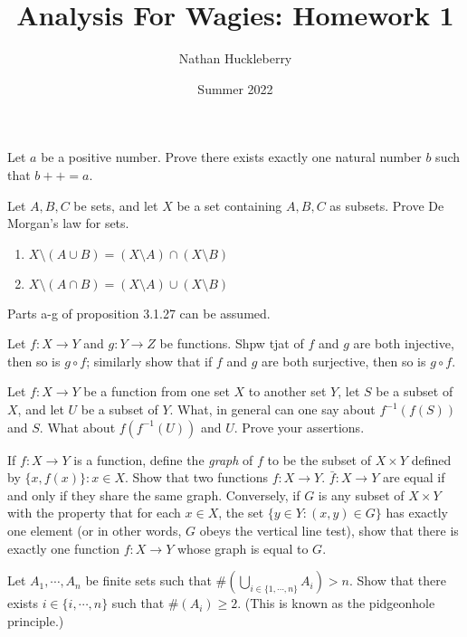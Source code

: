 \documentclass{article}
\title{Analysis For Wagies: Homework 1}
\author{Nathan Huckleberry} %
\date{Summer 2022}
\newenvironment{problem}[2][Problem]{\begin{trivlist}
     \item[\hskip \labelsep {\bfseries #1}\hskip \labelsep {\bfseries #2.}]}
{\end{trivlist}}
\begin{document}
\maketitle

\begin{problem}{2.2.2}
Let $a$ be a positive number. Prove there exists exactly one natural number $b$ such that $b++ = a$.
\end{problem}

\begin{problem}{3.1.6}
Let $A, B, C$ be sets, and let $X$ be a set containing $A, B, C$ as subsets. Prove De Morgan's law for sets.
\begin{enumerate}
    \item $X \setminus (A \cup B) = (X \setminus A) \cap (X \setminus B)$
    \item $X \setminus (A \cap B) = (X \setminus A) \cup (X \setminus B)$
\end{enumerate}
Parts a-g of proposition 3.1.27 can be assumed.
\end{problem}

\begin{problem}{3.3.2}
Let $f: X \to Y$ and $g: Y \to Z$ be functions. Shpw tjat of $f$ and $g$ are both injective, then so is $g \circ f$; similarly show that if $f$ and $g$ are both surjective, then so is $g \circ f$.
\end{problem}

\begin{problem}{3.4.2}
Let $f: X \to Y$ be a function from one set $X$ to another set $Y$, let $S$ be a subset of $X$, and let $U$ be a subset of $Y$. What, in general can one say about $f^{-1}(f(S))$ and $S$. What about $f(f^{-1}(U))$ and $U$. Prove your assertions.
\end{problem}

\begin{problem}{3.5.10}
If $f: X \to Y$ is a function, define the \emph{graph} of $f$ to be the subset of $X \times Y$ defined by $\{x, f(x)\} : x \in X$. Show that two functions $f: X \to Y$. $\bar{f}: X \to Y$ are equal if and only if they share the same graph. Conversely, if $G$ is any subset of $X \times Y$ with the property that for each $x \in X$, the set $\{y \in Y : (x,y) \in G\}$ has exactly one element (or in other words, $G$ obeys the vertical line test), show that there is exactly one function $f: X \to Y$ whose graph is equal to $G$.
\end{problem}

\begin{problem}{3.6.10}
Let $A_1, \cdots, A_n$ be finite sets such that $\#(\bigcup_{i \in \{1, \cdots, n\}} A_i) > n$. Show that there exists $i \in \{i, \cdots, n\}$ such that $\#(A_i) \ge 2$. (This is known as the pidgeonhole principle.)
\end{problem}
\end{document}
